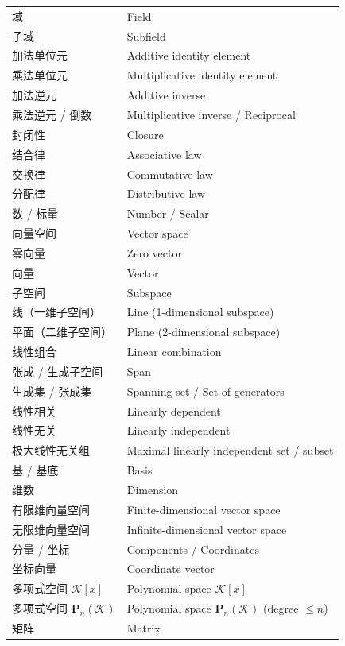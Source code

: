 \begin{center}
\begin{longtable}{|>{\raggedright\arraybackslash}p{5cm}|>{\raggedright\arraybackslash}p{8cm}|}
			域 & Field \\
			子域 & Subfield \\
			加法单位元 & Additive identity element \\
			乘法单位元 & Multiplicative identity element \\
			加法逆元 & Additive inverse \\
			乘法逆元 / 倒数 & Multiplicative inverse / Reciprocal \\
			封闭性 & Closure \\
			结合律 & Associative law \\
			交换律 & Commutative law \\
			分配律 & Distributive law \\
			数 / 标量 & Number / Scalar \\
			向量空间 & Vector space \\
			零向量 & Zero vector \\
			向量 & Vector \\
			子空间 & Subspace \\
			线（一维子空间） & Line (1-dimensional subspace) \\
			平面（二维子空间） & Plane (2-dimensional subspace) \\
			线性组合 & Linear combination \\
			张成 / 生成子空间 & Span \\
			生成集 / 张成集 & Spanning set / Set of generators \\
			线性相关 & Linearly dependent \\
			线性无关 & Linearly independent \\
			极大线性无关组 & Maximal linearly independent set / subset \\
			基 / 基底 & Basis \\
			维数 & Dimension \\
			有限维向量空间 & Finite-dimensional vector space \\
			无限维向量空间 & Infinite-dimensional vector space \\
			分量 / 坐标 & Components / Coordinates \\
			坐标向量 & Coordinate vector \\
			多项式空间 $\mathcal{K}[x]$ & Polynomial space $\mathcal{K}[x]$ \\
			多项式空间 $\mathbf P_n(\mathcal{K})$ & Polynomial space $\mathbf P_n(\mathcal{K})$ (degree $\le n$) \\
			矩阵 & Matrix \\

\end{longtable}
\end{center}
